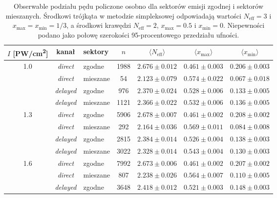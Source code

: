 \documentclass[12pt,a4paper]{article}
\newcommand{\Neff}{N_{\mathrm{eff}}}
\newcommand{\xmax}{x_{\max}}
\newcommand{\PWcm}{PW/cm\textsuperscript{2}}
\begin{document}
\begin{table}[htbp]
\centering
\small
\caption{Obserwable podziału pędu policzone osobno dla sektorów emisji
zgodnej i sektorów mieszanych. Środkowi trójkąta w metodzie simpleksowej  odpowiadają wartości
$\Neff=3$ i $\xmax=x_{\min}=1/3$, a środkowi krawędzi $\Neff=2$,
$\xmax=\num{0.5}$ i $x_{\min}=0$. Niepewności podano jako połowę szerokości 95-procentowego
przedziału ufności.}
\label{tab:simpleks}
\begin{tabular}{cclcccc}
\toprule
$I$ [\PWcm] & kanał & sektory & $n$ & $\langle\Neff\rangle$ &
$\langle\xmax\rangle$ & $\langle x_{\min}\rangle$ \\
\midrule
\num{1.0} & \emph{direct}  & zgodne   & \num{1988} & $\num{2.676}\pm\num{0.012}$ & $\num{0.461}\pm\num{0.003}$ & $\num{0.206}\pm\num{0.003}$ \\
          & \emph{direct}  & mieszane & \num{54} & $\num{2.123}\pm\num{0.079}$ & $\num{0.574}\pm\num{0.022}$ & $\num{0.067}\pm\num{0.018}$ \\
          & \emph{delayed} & zgodne   & \num{976} & $\num{2.370}\pm\num{0.024}$ & $\num{0.528}\pm\num{0.006}$ & $\num{0.133}\pm\num{0.005}$ \\
          & \emph{delayed} & mieszane & \num{1121} & $\num{2.366}\pm\num{0.022}$ & $\num{0.532}\pm\num{0.006}$ & $\num{0.136}\pm\num{0.005}$ \\
\midrule
\num{1.3} & \emph{direct}  & zgodne   & \num{5906} & $\num{2.678}\pm\num{0.007}$ & $\num{0.461}\pm\num{0.002}$ & $\num{0.208}\pm\num{0.002}$ \\
          & \emph{direct}  & mieszane & \num{292} & $\num{2.164}\pm\num{0.036}$ & $\num{0.569}\pm\num{0.011}$ & $\num{0.084}\pm\num{0.008}$ \\
          & \emph{delayed} & zgodne   & \num{2815} & $\num{2.384}\pm\num{0.014}$ & $\num{0.526}\pm\num{0.004}$ & $\num{0.138}\pm\num{0.003}$ \\
          & \emph{delayed} & mieszane & \num{3022} & $\num{2.328}\pm\num{0.014}$ & $\num{0.543}\pm\num{0.004}$ & $\num{0.130}\pm\num{0.003}$ \\
\midrule
\num{1.6} & \emph{direct}  & zgodne   & \num{7992} & $\num{2.673}\pm\num{0.006}$ & $\num{0.461}\pm\num{0.002}$ & $\num{0.207}\pm\num{0.002}$ \\
          & \emph{direct}  & mieszane & \num{807} & $\num{2.238}\pm\num{0.026}$ & $\num{0.564}\pm\num{0.007}$ & $\num{0.110}\pm\num{0.005}$ \\
          & \emph{delayed} & zgodne   & \num{3648} & $\num{2.418}\pm\num{0.012}$ & $\num{0.521}\pm\num{0.003}$ & $\num{0.148}\pm\num{0.003}$ \\

\end{tabular}
\end{table}
\end{document}
